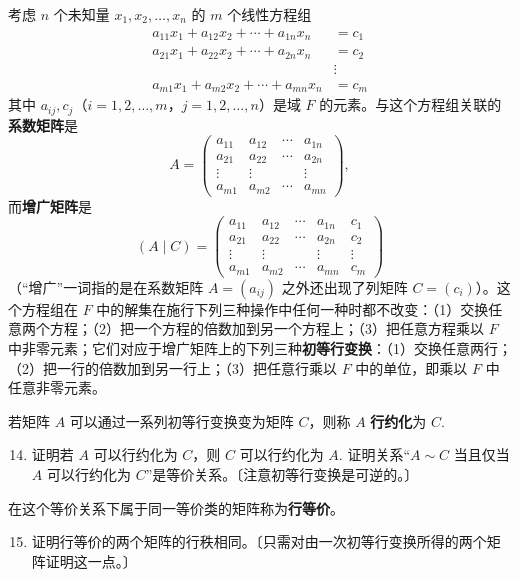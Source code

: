 考虑 \(n\) 个未知量 \(x_1, x_2, \ldots, x_n\) 的 \(m\) 个线性方程组
\begin{equation}
\begin{aligned}
a_{11}x_1+a_{12}x_2+\cdots+a_{1n}x_n &= c_1\\
a_{21}x_1+a_{22}x_2+\cdots+a_{2n}x_n &= c_2\\
&\vdots\\
a_{m1}x_1+a_{m2}x_2+\cdots+a_{mn}x_n &= c_m
\end{aligned}\tag{11.4}
\end{equation}
其中 \(a_{ij}, c_j\)（\(i = 1, 2, \ldots, m\)，\(j = 1, 2, \ldots, n\)）是域 \(F\) 的元素。与这个方程组关联的\textbf{系数矩阵}是
\[
A = \begin{pmatrix} a_{11} & a_{12} & \cdots & a_{1n} \\ a_{21} & a_{22} & \cdots & a_{2n} \\ \vdots & \vdots & & \vdots \\ a_{m1} & a_{m2} & \cdots & a_{mn} \end{pmatrix},
\]
而\textbf{增广矩阵}是
\[
(A \mid C) = \begin{pmatrix} a_{11} & a_{12} & \cdots & a_{1n} & c_1 \\ a_{21} & a_{22} & \cdots & a_{2n} & c_2 \\ \vdots & \vdots & & \vdots & \vdots \\ a_{m1} & a_{m2} & \cdots & a_{mn} & c_m \end{pmatrix}
\]
（“增广”一词指的是在系数矩阵 \(A = (a_{ij})\) 之外还出现了列矩阵 \(C = (c_i)\)）。这个方程组在 \(F\) 中的解集在施行下列三种操作中任何一种时都不改变：（1）交换任意两个方程；（2）把一个方程的倍数加到另一个方程上；（3）把任意方程乘以 \(F\) 中非零元素；它们对应于增广矩阵上的下列三种\textbf{初等行变换}：（1）交换任意两行；（2）把一行的倍数加到另一行上；（3）把任意行乘以 \(F\) 中的单位，即乘以 \(F\) 中任意非零元素。

若矩阵 \(A\) 可以通过一系列初等行变换变为矩阵 \(C\)，则称 \(A\) \textbf{行约化}为 \(C\).

\begin{enumerate}
\setcounter{enumi}{13}
\item 证明若 \(A\) 可以行约化为 \(C\)，则 \(C\) 可以行约化为 \(A\). 证明关系“\(A \sim C\) 当且仅当 \(A\) 可以行约化为 \(C\)”是等价关系。〔注意初等行变换是可逆的。〕
\end{enumerate}

\noindent 在这个等价关系下属于同一等价类的矩阵称为\textbf{行等价}。

\begin{enumerate}
\setcounter{enumi}{14}
\item 证明行等价的两个矩阵的行秩相同。〔只需对由一次初等行变换所得的两个矩阵证明这一点。〕
\end{enumerate}

